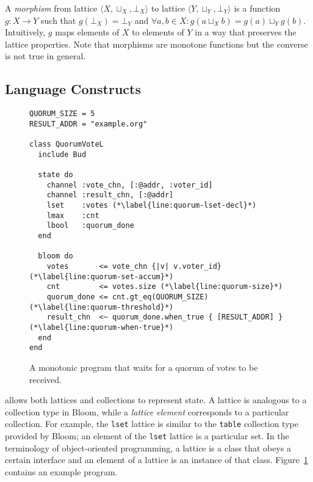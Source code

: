 A \emph{morphism} from lattice $\langle X, \sqcup_X, \bot_X\rangle$ to lattice
$\langle Y, \sqcup_Y, \bot_Y\rangle$ is a function $g: X \to Y$ such that
$g(\bot_X) = \bot_Y$ and $\forall a,b \in X: g(a \sqcup_X b) = g(a) \sqcup_Y
g(b)$. Intuitively, $g$ maps elements of $X$ to elements of $Y$ in a way that
preserves the lattice properties.  Note that morphisms are monotone functions
but the converse is not true in general.

\subsection{Language Constructs}
\begin{figure}[t]
\begin{scriptsize}
\begin{lstlisting}
QUORUM_SIZE = 5
RESULT_ADDR = "example.org"

class QuorumVoteL
  include Bud

  state do
    channel :vote_chn, [:@addr, :voter_id]
    channel :result_chn, [:@addr]
    lset    :votes (*\label{line:quorum-lset-decl}*)
    lmax    :cnt
    lbool   :quorum_done
  end

  bloom do
    votes       <= vote_chn {|v| v.voter_id} (*\label{line:quorum-set-accum}*)
    cnt         <= votes.size (*\label{line:quorum-size}*)
    quorum_done <= cnt.gt_eq(QUORUM_SIZE) (*\label{line:quorum-threshold}*)
    result_chn  <~ quorum_done.when_true { [RESULT_ADDR] } (*\label{line:quorum-when-true}*)
  end
end
\end{lstlisting}
\end{scriptsize}
\caption{A monotonic \lang program that waits for a quorum of votes to be received.}
\label{fig:lattice-quorum}
\end{figure}

\lang allows both lattices and collections to represent state. A lattice is
analogous to a collection type in Bloom, while a \emph{lattice element}
corresponds to a particular collection. For example, the \texttt{lset} lattice
is similar to the \texttt{table} collection type provided by Bloom; an element
of the \texttt{lset} lattice is a particular set. In the terminology of
object-oriented programming, a lattice is a class that obeys a certain interface
and an element of a lattice is an instance of that
class. Figure~\ref{fig:lattice-quorum} contains an example \lang program.

